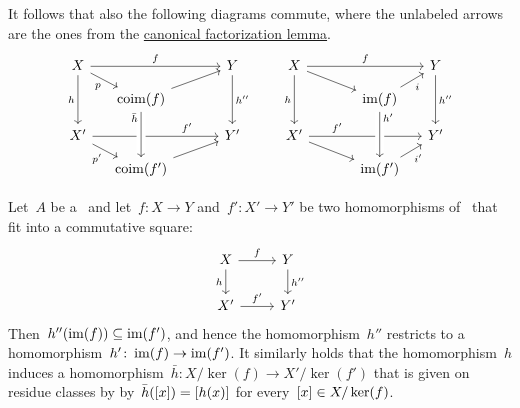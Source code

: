 \begin{remark*}
\begin{enumerate}
      It follows that also the following diagrams commute, where the unlabeled arrows are the ones from the \hyperref[canonical factorization]{canonical factorization lemma}.
      \[
        \begin{tikzcd}[sep = small]
            X
            \arrow{rrr}[above]{f}
            \arrow{dr}[below left]{p}
            \arrow{dd}[left]{h}
          & {}
          & {}
          & Y
            \arrow{dd}[right]{h''}
          \\
            {}
          & \coim(f)
            \arrow{urr}
          & {}
          & {}
          \\
            X'
            \arrow{rrr}[above, near end]{f'}
            \arrow{dr}[below left]{p'}
          & {}
          & {}
          & Y'
          \\
            {}
          & \coim(f')
            \arrow[from=uu, crossing over, "\bar{h}", swap, very near start]
            \arrow{urr}
          & {}
          & {}
        \end{tikzcd}
        \quad\quad
        \begin{tikzcd}[sep = small]
            X
            \arrow{rrr}[above]{f}
            \arrow{drr}
            \arrow{dd}[left]{h}
          & {}
          & {}
          & Y
            \arrow{dd}[right]{h''}
          \\
            {}
          & {}
          & \im(f)
            \arrow{ur}[below right]{i}
          & {}
          \\
            X'
            \arrow{rrr}[above, near start]{f'}
            \arrow{drr}
          & {}
          & {}
          & Y'
          \\
            {}
          & {}
          & \im(f')
            \arrow[from=uu, crossing over, "h'", right, very near start]
            \arrow{ur}[below right]{i'}
          & {}
        \end{tikzcd}
      \]
  \end{enumerate}
\end{remark*}


\begin{example*}
  Let~$A$ be a~{\kalg} and let~$f \colon X \to Y$ and~$f' \colon X' \to Y'$ be two homomorphisms of~{} that fit into a commutative square:
  \[
    \begin{tikzcd}
        X
        \arrow{r}[above]{f}
        \arrow{d}[left]{h}
      & Y
        \arrow{d}[right]{h''}
      \\
        X'
        \arrow{r}[above]{f'}
      & Y'
    \end{tikzcd}
  \]
  Then~$h''(\operatorname{im}(f)) \subseteq \operatorname{im}(f')$, and hence the homomorphism~$h''$ restricts to a homomorphism~$h' \colon \operatorname{im}(f) \to \operatorname{im}(f')$.
  It similarly holds that the homomorphism~$h$ induces a {\welldef} homomorphism~$\bar{h} \colon X/\ker(f) \to X'/\ker(f')$ that is given on residue classes by by~$\bar{h}([x]) = [h(x)]$ for every~$[x] \in X/\ker(f)$.
\end{example*}




